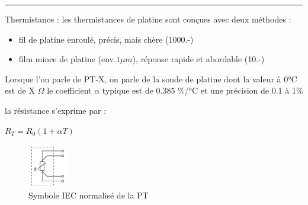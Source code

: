 \documentclass[	DIV=calc,%
							paper=a4,%
							fontsize=11pt,%
							twocolumn]{scrartcl} %
\newcommand{\hformbar}[1]{\bigskip\hrule\vspace{5pt}} %
\newcounter{mycounter}
\newcommand{\formdesc}[1]{\noindent\textbf{#1} \addtocounter{mycounter}{1} \hfill \themycounter}
\begin{document}
\hformbar

\formdesc{Capteur résistif}

Thermistance :
les thermistances de platine sont conçues avec deux méthodes : 
\begin{itemize}
    \item fil de platine enroulé, précis, mais chère (1000.-)
    \item film mince de platine (env.$1\mu m$), réponse rapide et abordable (10.-)
\end{itemize}
Lorsque l'on parle de PT-X,  on parle de la sonde de platine dont la valeur à 0°C est de X $\Omega$
le coefficient $\alpha$ typique est de 0.385 \%/°C et une précision de 0.1 à 1\%

la résistance s'exprime par :

{\hfill $R_{T} = R_0 (1+\alpha T)$ \hfill}

\begin{figure}[H]
    \begin{center}
        \includegraphics[width=0.15\textwidth]{img/PT.JPG}
        \caption{Symbole IEC normalisé de la PT}
        \label{fig:symbole_PT}
    \end{center}
\end{figure}
\end{document}
